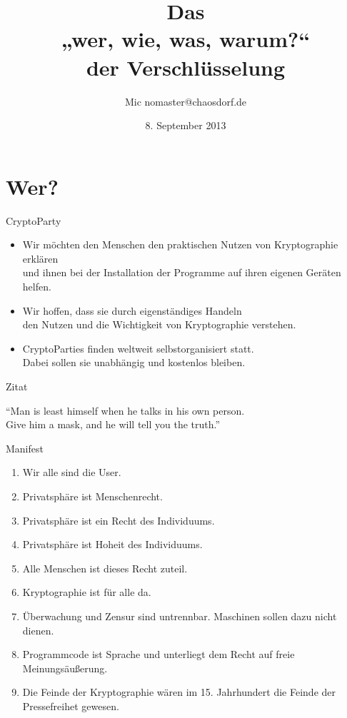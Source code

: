 \documentclass[aspectratio=1610]{beamer}
\title{Das\\„wer, wie, was, warum?“\\der Verschlüsselung}
\author[Mic]{Mic \flq nomaster@chaosdorf.de\frq}
\institute[chaosdorf]{Chaos Computer Club Düsseldorf / Chaosdorf e.V.}
\date[]{8. September 2013}
\begin{document}
  \begin{frame}
    \titlepage
  \end{frame}

  \section{Wer?}

  \begin{frame}{CryptoParty}
    \begin{itemize}
      \item
        Wir möchten den Menschen den praktischen Nutzen von Kryptographie erklären\\
        und ihnen bei der Installation der Programme auf ihren eigenen Geräten helfen.
    \pause
      \item
        Wir hoffen, dass sie durch eigenständiges Handeln\\
        den Nutzen und die Wichtigkeit von Kryptographie verstehen.
    \pause
      \item
        CryptoParties finden weltweit selbstorganisiert statt.\\
        Dabei sollen sie unabhängig und kostenlos bleiben.
    \end{itemize}
  \end{frame}

  \begin{frame}{Zitat}
    \begin{exampleblock}{}
      {\large “Man is least himself when he talks in his own person.\\
      Give him a mask, and he will tell you the truth.”}
      \vskip5mm
      \hspace*{}
    \end{exampleblock}
  \end{frame}
  \begin{frame}{Manifest}
    \begin{enumerate}
      \pause
      \item Wir alle sind die User.
      \pause
      \item Privatsphäre ist Menschenrecht.
      \pause
      \item Privatsphäre ist ein Recht des Individuums.
      \pause
      \item Privatsphäre ist Hoheit des Individuums.
      \pause
      \item Alle Menschen ist dieses Recht zuteil.
      \pause
      \item Kryptographie ist für alle da.
      \pause
      \item Überwachung und Zensur sind untrennbar. Maschinen sollen dazu nicht dienen.
      \pause
      \item Programmcode ist Sprache und unterliegt dem Recht auf freie Meinungsäußerung.
      \pause
      \item Die Feinde der Kryptographie wären im 15. Jahrhundert die Feinde der Pressefreihet gewesen.
    \end{enumerate}
  \end{frame}
\end{document}
